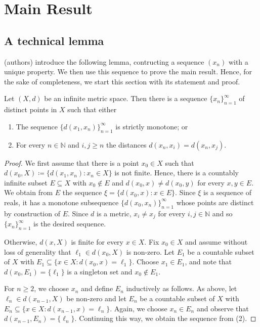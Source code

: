 \section{Main Result}


\subsection{A technical lemma} (authors) introduce the following lemma, contructing a sequence \( (x_{n}) \) with a unique property. We then use this sequence to prove the main result. Hence, for the sake of completeness, we start this section with its statement and proof.

\begin{lemma}
Let \( (X, d) \) be an infinite metric space. Then there is a sequence \( \{ x_{n}  \}_{n = 1} ^{\infty}  \) of distinct points in \( X \) such that either
\begin{enumerate}[leftmargin = 1.2cm]
	\item The sequence \( \{ d(x_1, x_{n} ) \}_{n = 1} ^{\infty}  \) is strictly monotone; or
	\item For every \( n \in \mathbb{N}  \) and \( i,j \geq n \) the distances \( d(x_{n} , x_{i} ) = d(x_{n} , x_{j} ) \).
	
\end{enumerate}
\end{lemma}
\begin{proof}
We first assume that there is a point \( x_0 \in X \) such that \( d(x_0, X) \coloneqq \{ d(x_1, x_{n} ) : x_{n} \in X \}  \) is not finite. Hence, there is a countably infinite subset \( E \subseteq X \) with \( x_0 \notin E \) and \( d(x_0, x) \neq d(x_0, y) \) for every \( x,y \in E \). We obtain from \( E \) the sequence \( \xi = \{ d(x_0, x) : x \in E \}  \). Since \( \xi \) is a sequence of reals, it has a monotone subsequence \( \{ d(x_0, x_{n} ) \}_{n=1} ^{\infty} \) whose points are distinct by construction of \( E \). Since \( d \) is a metric, \( x_{i} \neq x_{j}  \) for every \( i,j \in \mathbb{N}  \) and so \( \{ x_{n}  \}_{n = 1} ^{\infty}  \) is the desired sequence.

Otherwise, \( d(x, X) \) is finite for every \( x \in X \). Fix \( x_0 \in X \) and assume without loss of generality that \( \ell_1 \in d(x_0, X)\) is non-zero. Let \( E_1 \) be a countable subset of \( X \) with \(E_1 \subseteq  \{ x \in X : d(x_0, x) = \ell_1 \}. \) Choose \( x_1 \in E_1 \), and note that \( d(x_0, E_1) = \{ \ell_1 \} \) is a singleton set and \( x_0 \notin E_1 \). 

For \( n \geq 2 \), we choose \( x_{n}  \) and define \( E_{n}  \) inductively as follows. As above, let \( \ell_{n} \in d(x_{n-1} , X) \) be non-zero and let \( E_{n}  \) be a countable subset of \( X \) with \( E_{n} \subseteq \{ x \in X : d(x_{n-1} , x) = \ell_{n} \} . \) Again, we choose \( x_{n} \in E_{n}  \) and observe that \( d(x_{n-1} , E_{n} ) = \{ \ell_{n}  \}  \). Continuing this way, we obtain the sequence from (2).
\end{proof}


